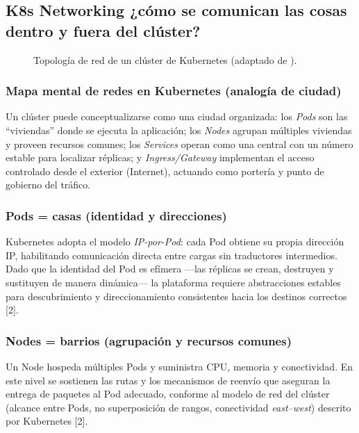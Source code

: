 \documentclass[journal]{IEEEtran}
\begin{document}
\subsection{K8s Networking ¿cómo se comunican las cosas dentro y fuera del clúster?}

\begin{figure}[htbp]
  \centering
  
  \caption{Topología de red de un clúster de Kubernetes (adaptado de \cite{ref2}).}
  \label{fig:k8s-cluster-network}
\end{figure}

\medskip
\subsubsection{Mapa mental de redes en Kubernetes (analogía de ciudad)}

Un clúster puede conceptualizarse como una ciudad organizada: los \emph{Pods} son las “viviendas” donde se ejecuta la aplicación; los \emph{Nodes} agrupan múltiples viviendas y proveen recursos comunes; los \emph{Services} operan como una central con un número estable para localizar réplicas; y \emph{Ingress/Gateway} implementan el acceso controlado desde el exterior (Internet), actuando como portería y punto de gobierno del tráfico.

\medskip
\subsubsection{Pods = casas (identidad y direcciones)}

Kubernetes adopta el modelo \emph{IP-por-Pod}: cada Pod obtiene su propia dirección IP, habilitando comunicación directa entre cargas sin traductores intermedios. Dado que la identidad del Pod es efímera —las réplicas se crean, destruyen y sustituyen de manera dinámica— la plataforma requiere abstracciones estables para descubrimiento y direccionamiento consistentes hacia los destinos correctos [2].

\medskip
\subsubsection{Nodes = barrios (agrupación y recursos comunes)}

Un Node hospeda múltiples Pods y suministra CPU, memoria y conectividad. En este nivel se sostienen las rutas y los mecanismos de reenvío que aseguran la entrega de paquetes al Pod adecuado, conforme al modelo de red del clúster (alcance entre Pods, no superposición de rangos, conectividad \emph{east--west}) descrito por Kubernetes [2].
\end{document}
